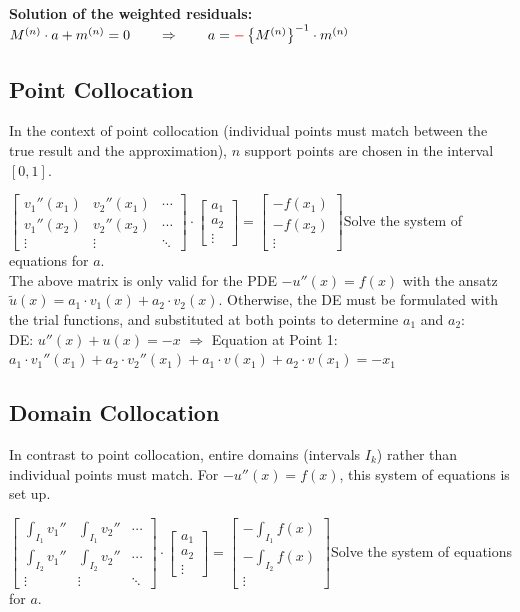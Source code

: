 \textbf{Solution of the weighted residuals:}
$M^{(n)}\cdot a+m^{(n)}=0\qquad \Rightarrow \qquad a=\textcolor{red}{\mathbf{-}}\left\{M^{(n)}\right\}^{-1}\cdot m^{(n)}$

\subsection{Point Collocation}
In the context of point collocation (individual points must match between the true result and the approximation),
$n$ support points are chosen in the interval $[0,1]$.

$\begin{bmatrix}
	v_1''(x_1)& v_2''(x_1)&\cdots\\
	v_1''(x_2)& v_2''(x_2)&\cdots\\
	\vdots& \vdots&\ddots
\end{bmatrix}\cdot
\begin{bmatrix}
a_1\\
a_2\\
\vdots
\end{bmatrix}
=\begin{bmatrix}
-f(x_1)\\
-f(x_2)\\
\vdots
\end{bmatrix}$\qquad Solve the system of equations for $a$.\\

The above matrix is only valid for the PDE $-u''(x) = f(x)$ with the ansatz
$\tilde{u}(x) = a_1 \cdot v_1(x) + a_2 \cdot v_2(x)$. Otherwise, the
DE must be formulated with the trial functions, and
substituted at both points to determine $a_1$ and $a_2$:\\
DE: $u''(x) + u(x) = -x$ $\Rightarrow$ Equation at Point 1: $a_1 \cdot
v_1''(x_1) + a_2 \cdot v_2''(x_1) + a_1 \cdot v(x_1) + a_2 \cdot v(x_1) = - x_1$


\subsection{Domain Collocation}
In contrast to point collocation, entire domains (intervals $I_k$) rather than individual points must match.
For $-u''(x) = f(x)$, this system of equations is set up.

$\begin{bmatrix}
	\int_{I_1} v_1'' & \int_{I_1} v_2''& \cdots\\
	\int_{I_2} v_1'' & \int_{I_2} v_2''& \cdots\\
	\vdots& \vdots&\ddots
\end{bmatrix}\cdot
\begin{bmatrix}
a_1\\
a_2\\
\vdots
\end{bmatrix}
=\begin{bmatrix}
-\int_{I_1} f(x)\\
-\int_{I_2} f(x)\\
\vdots
\end{bmatrix}$\qquad Solve the system of equations for $a$.


